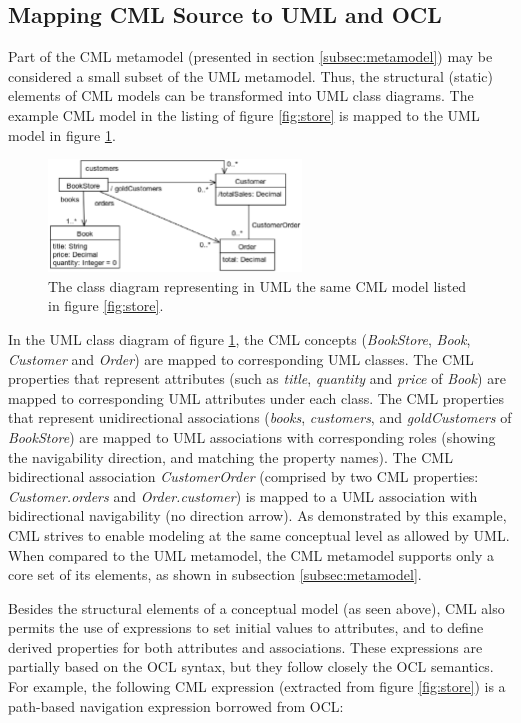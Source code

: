 \subsection{Mapping CML Source to UML and OCL}\label{subsec:mapping}

Part of the CML metamodel (presented in section \ref{subsec:metamodel}) may be considered a small subset of the UML  \cite{uml} metamodel.
Thus, the structural (static) elements of CML models can be transformed into UML class diagrams. The example CML model in the listing of figure \ref{fig:store} is mapped to the UML model in figure \ref{fig:uml}.

\begin{figure}
\centering
\includegraphics[width=0.6\textwidth]{language/diagram-uml}
\caption{The class diagram representing in UML  \cite{uml} the same CML model listed in figure \ref{fig:store}.}
\label{fig:uml}
\end{figure}

In the UML class diagram of figure \ref{fig:uml},
the CML concepts (\emph{BookStore}, \emph{Book}, \emph{Customer} and \emph{Order})
are mapped to corresponding UML classes.
The CML properties that represent attributes
(such as \emph{title}, \emph{quantity} and \emph{price} of \emph{Book})
are mapped to corresponding UML attributes under each class.
The CML properties that represent unidirectional associations
(\emph{books}, \emph{customers}, and \emph{goldCustomers} of \emph{BookStore})
are mapped to UML associations with corresponding roles
(showing the navigability direction, and matching the property names).
The CML bidirectional association \emph{CustomerOrder}
(comprised by two CML properties: \emph{Customer.orders} and \emph{Order.customer})
is mapped to a UML association with bidirectional navigability (no direction arrow).
As demonstrated by this example,
CML strives to enable modeling at the same conceptual level as allowed by UML.
When compared to the UML metamodel,
the CML metamodel supports only a core set of its elements, as shown in subsection \ref{subsec:metamodel}.

Besides the structural elements of a conceptual model (as seen above),
CML also permits the use of expressions to set initial values to attributes,
and to define derived properties for both attributes and associations.
These expressions are partially based on the OCL \cite{ocl} syntax,
but they follow closely the OCL semantics.
For example, the following CML expression (extracted from figure \ref{fig:store}) is a path-based navigation expression borrowed from OCL:

